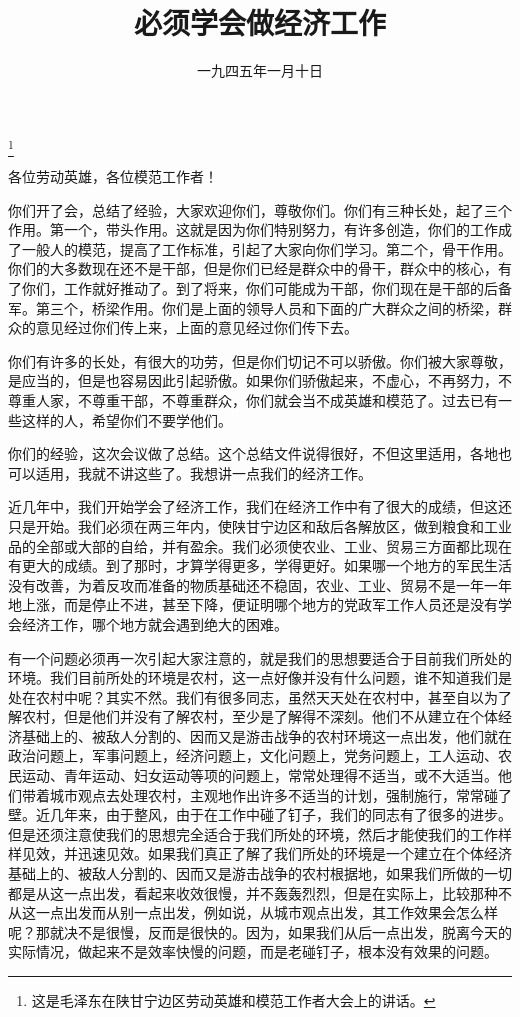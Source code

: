 
\title{必须学会做经济工作}
\date{一九四五年一月十日}
\thanks{这是毛泽东在陕甘宁边区劳动英雄和模范工作者大会上的讲话。}
\maketitle


各位劳动英雄，各位模范工作者！

你们开了会，总结了经验，大家欢迎你们，尊敬你们。你们有三种长处，起了三个作用。第一个，带头作用。这就是因为你们特别努力，有许多创造，你们的工作成了一般人的模范，提高了工作标准，引起了大家向你们学习。第二个，骨干作用。你们的大多数现在还不是干部，但是你们已经是群众中的骨干，群众中的核心，有了你们，工作就好推动了。到了将来，你们可能成为干部，你们现在是干部的后备军。第三个，桥梁作用。你们是上面的领导人员和下面的广大群众之间的桥梁，群众的意见经过你们传上来，上面的意见经过你们传下去。

你们有许多的长处，有很大的功劳，但是你们切记不可以骄傲。你们被大家尊敬，是应当的，但是也容易因此引起骄傲。如果你们骄傲起来，不虚心，不再努力，不尊重人家，不尊重干部，不尊重群众，你们就会当不成英雄和模范了。过去已有一些这样的人，希望你们不要学他们。

你们的经验，这次会议做了总结。这个总结文件说得很好，不但这里适用，各地也可以适用，我就不讲这些了。我想讲一点我们的经济工作。

近几年中，我们开始学会了经济工作，我们在经济工作中有了很大的成绩，但这还只是开始。我们必须在两三年内，使陕甘宁边区和敌后各解放区，做到粮食和工业品的全部或大部的自给，并有盈余。我们必须使农业、工业、贸易三方面都比现在有更大的成绩。到了那时，才算学得更多，学得更好。如果哪一个地方的军民生活没有改善，为着反攻而准备的物质基础还不稳固，农业、工业、贸易不是一年一年地上涨，而是停止不进，甚至下降，便证明哪个地方的党政军工作人员还是没有学会经济工作，哪个地方就会遇到绝大的困难。

有一个问题必须再一次引起大家注意的，就是我们的思想要适合于目前我们所处的环境。我们目前所处的环境是农村，这一点好像并没有什么问题，谁不知道我们是处在农村中呢？其实不然。我们有很多同志，虽然天天处在农村中，甚至自以为了解农村，但是他们并没有了解农村，至少是了解得不深刻。他们不从建立在个体经济基础上的、被敌人分割的、因而又是游击战争的农村环境这一点出发，他们就在政治问题上，军事问题上，经济问题上，文化问题上，党务问题上，工人运动、农民运动、青年运动、妇女运动等项的问题上，常常处理得不适当，或不大适当。他们带着城市观点去处理农村，主观地作出许多不适当的计划，强制施行，常常碰了壁。近几年来，由于整风，由于在工作中碰了钉子，我们的同志有了很多的进步。但是还须注意使我们的思想完全适合于我们所处的环境，然后才能使我们的工作样样见效，并迅速见效。如果我们真正了解了我们所处的环境是一个建立在个体经济基础上的、被敌人分割的、因而又是游击战争的农村根据地，如果我们所做的一切都是从这一点出发，看起来收效很慢，并不轰轰烈烈，但是在实际上，比较那种不从这一点出发而从别一点出发，例如说，从城市观点出发，其工作效果会怎么样呢？那就决不是很慢，反而是很快的。因为，如果我们从后一点出发，脱离今天的实际情况，做起来不是效率快慢的问题，而是老碰钉子，根本没有效果的问题。

